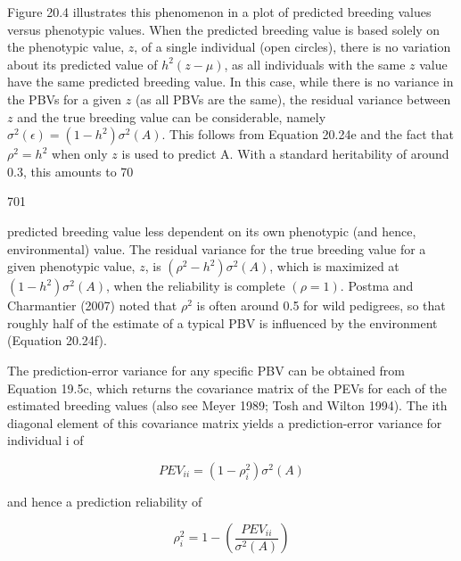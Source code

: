 \documentclass{article}
\begin{document}
Figure 20.4 illustrates this phenomenon in a plot of predicted breeding values versus phenotypic values. When the predicted breeding value is based solely on the phenotypic value, $z$, of a single individual (open circles), there is no variation about its predicted value of $h^{2}(z-\mu)$, as all individuals with the same $z$ value have the same predicted breeding value. In this case, while there is no variance in the PBVs for a given $z$ (as all PBVs are the same), the residual variance between $z$ and the true breeding value can be considerable, namely $\sigma^{2}(\epsilon)=(1-h^{2})\sigma^{2}(A)$. This follows from Equation 20.24e and the fact that $\rho^{2}=h^{2}$ when only $z$ is used to predict A. With a standard heritability of around 0.3, this amounts to 70%

701

predicted breeding value less dependent on its own phenotypic (and hence, environmental) value. The residual variance for the true breeding value for a given phenotypic value, $z$, is $(\rho^{2}-h^{2})\sigma^{2}(A)$, which is maximized at $(1-h^{2})\sigma^{2}(A)$, when the reliability is complete $(\rho=1)$. Postma and Charmantier (2007) noted that $\rho^{2}$ is often around 0.5 for wild pedigrees, so that roughly half of the estimate of a typical PBV is influenced by the environment (Equation 20.24f).

The prediction-error variance for any specific PBV can be obtained from Equation 19.5c, which returns the covariance matrix of the PEVs for each of the estimated breeding values (also see Meyer 1989; Tosh and Wilton 1994). The ith diagonal element of this covariance matrix yields a prediction-error variance for individual i of

\begin{equation}
PEV_{ii}=(1-\rho_{i}^{2})\sigma^{2}(A)
\tag{20.24g}
\label{eq:20_24g}
\end{equation}

and hence a prediction reliability of

\begin{equation}
\rho_{i}^{2}=1-\left(\frac{P E V_{ii}}{\sigma^{2}(A)}\right)
\tag{20.24h}
\label{eq:20_24h}
\end{equation}
\end{document}
